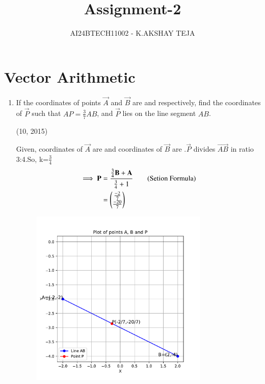 \documentclass[journal]{IEEEtran}
\begin{document}

\onecolumn
\newpage
\title{Assignment-2}
\author{AI24BTECH11002 - K.AKSHAY TEJA}
\maketitle




\section{Vector Arithmetic}
\begin{enumerate}
 \item If the coordinates of points $\vec{A}$ and $\vec{B}$ are  and  respectively, find the coordinates of $\vec{P}$ such that $AP = \frac{3}{7} AB$, and $\vec{P}$ lies on the line segment $AB$. 
 
    \hfill {(10, 2015)}

 \solution
 Given, coordinates of $\vec{A}$ are  and coordinates of $\vec{B}$ are .$\vec{P}$ divides $\vec{AB}$ in ratio 3:4.So, k=$\frac{3}{4}$
 \begin{align*}
	 \implies \mathbf{P} &= \frac{\frac{3}{4}\mathbf{B} + \mathbf{A}}{\frac{3}{4} + 1} \tag{Setion Formula}\\
	 &= \begin{pmatrix}\frac{-2}{7}\\\frac{-20}{7}\end{pmatrix} 
 \end{align*}
		\begin{figure}[h]    
	  \begin{center}
		\includegraphics[width=0.8\textwidth]{Fig.pdf}
	 \end{center}	  
	\end{figure}
\end{enumerate}
\end{document}

